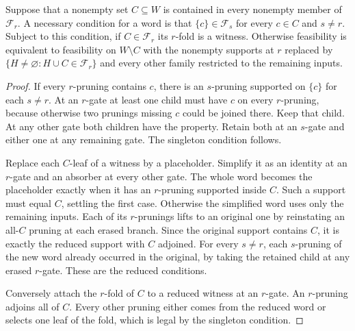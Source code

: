 \begin{proposition}
\label{core:prop:compulsory-prunings}
Suppose that a nonempty set $C\subseteq W$ is contained in every
nonempty member of $\mathcal F_r$. A necessary condition for a word
is that $\{c\}\in\mathcal F_s$ for every $c\in C$ and $s\ne r$.
Subject to this condition, if $C\in\mathcal F_r$ its $r$-fold is
a witness. Otherwise feasibility is equivalent to feasibility on
$W\setminus C$ with the nonempty supports at $r$ replaced by
$\{H\ne\varnothing:H\cup C\in\mathcal F_r\}$ and every other
family restricted to the remaining inputs.
\end{proposition}
\begin{proof}
If every $r$-pruning contains $c$, there is an $s$-pruning supported
on $\{c\}$ for each $s\ne r$. At an $r$-gate at least one child
must have $c$ on every $r$-pruning, because otherwise two prunings
missing $c$ could be joined there. Keep that child. At any other
gate both children have the property. Retain both at an $s$-gate
and either one at any remaining gate. The singleton condition follows.

Replace each $C$-leaf of a witness by a placeholder. Simplify it as
an identity at an $r$-gate and an absorber at every other gate.
The whole word becomes the placeholder exactly when it has an
$r$-pruning supported inside $C$. Such a support must equal $C$,
settling the first case. Otherwise the simplified word uses only
the remaining inputs. Each of its $r$-prunings lifts to an original
one by reinstating an all-$C$ pruning at each erased branch. Since
the original support contains $C$, it is exactly the reduced support
with $C$ adjoined. For every $s\ne r$, each $s$-pruning of the new
word already occurred in the original, by taking the retained child
at any erased $r$-gate. These are the reduced conditions.

Conversely attach the $r$-fold of $C$ to a reduced witness at an
$r$-gate. An $r$-pruning adjoins all of $C$. Every other pruning
either comes from the reduced word or selects one leaf of the fold,
which is legal by the singleton condition.
\end{proof}

